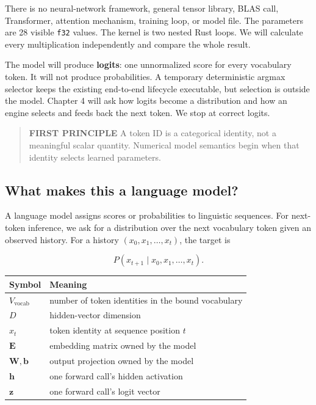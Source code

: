 \documentclass[
  10pt,
]{article}
\newcounter{none} %
\begin{document}
There is no neural-network framework, general tensor library, BLAS call,
Transformer, attention mechanism, training loop, or model file. The
parameters are 28 visible \texttt{f32} values. The kernel is two nested
Rust loops. We will calculate every multiplication independently and
compare the whole result.

The model will produce \textbf{logits}: one unnormalized score for every
vocabulary token. It will not produce probabilities. A temporary
deterministic argmax selector keeps the existing end-to-end lifecycle
executable, but selection is outside the model. Chapter 4 will ask how
logits become a distribution and how an engine selects and feeds back
the next token. We stop at correct logits.

\begin{quote}
\textbf{FIRST PRINCIPLE} A token ID is a categorical identity, not a
meaningful scalar quantity. Numerical model semantics begin when that
identity selects learned parameters.
\end{quote}

\subsection{What makes this a language
model?}\label{what-makes-this-a-language-model}

A language model assigns scores or probabilities to linguistic
sequences. For next-token inference, we ask for a distribution over the
next vocabulary token given an observed history. For a history
\((x_0,x_1,\ldots,x_t)\), the target is

\[
P\!\left(x_{t+1}\mid x_0,x_1,\ldots,x_t\right).
\]

{\def\LTcaptype{none} %
\begin{longtable}[]{@{}
  >{\raggedright\arraybackslash}p{}
  >{\raggedright\arraybackslash}p{}@{}}
\toprule\noalign{}
\begin{minipage}[b]{\linewidth}\raggedright
Symbol
\end{minipage} & \begin{minipage}[b]{\linewidth}\raggedright
Meaning
\end{minipage} \\
\midrule\noalign{}
\endhead
\bottomrule\noalign{}
\endlastfoot
\(V_{\mathrm{vocab}}\) & number of token identities in the bound
vocabulary \\
\(D\) & hidden-vector dimension \\
\(x_t\) & token identity at sequence position \(t\) \\
\(\mathbf{E}\) & embedding matrix owned by the model \\
\(\mathbf{W},\mathbf{b}\) & output projection owned by the model \\
\(\mathbf{h}\) & one forward call's hidden activation \\
\(\mathbf{z}\) & one forward call's logit vector \\
\end{longtable}
}
\end{document}
